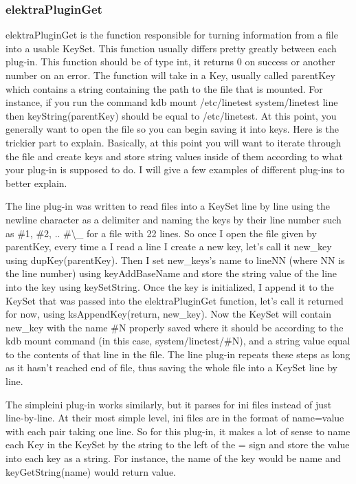 \subsubsection*{elektra\+Plugin\+Get}

{\ttfamily elektra\+Plugin\+Get} is the function responsible for turning information from a file into a usable Key\+Set. This function usually differs pretty greatly between each plug-\/in. This function should be of type int, it returns 0 on success or another number on an error. The function will take in a Key, usually called {\ttfamily parent\+Key} which contains a string containing the path to the file that is mounted. For instance, if you run the command {\ttfamily kdb mount /etc/linetest system/linetest line} then {\ttfamily key\+String(parent\+Key)} should be equal to {\ttfamily /etc/linetest}. At this point, you generally want to open the file so you can begin saving it into keys. Here is the trickier part to explain. Basically, at this point you will want to iterate through the file and create keys and store string values inside of them according to what your plug-\/in is supposed to do. I will give a few examples of different plug-\/ins to better explain.

The line plug-\/in was written to read files into a Key\+Set line by line using the newline character as a delimiter and naming the keys by their line number such as {\ttfamily \#1}, {\ttfamily \#2}, .. {\ttfamily \#\textbackslash{}\+\_} for a file with 22 lines. So once I open the file given by {\ttfamily parent\+Key}, every time a I read a line I create a new key, let's call it new\+\_\+key using dup\+Key(parent\+Key). Then I set new\+\_\+keys's name to line\+N\+N (where N\+N is the line number) using {\ttfamily key\+Add\+Base\+Name} and store the string value of the line into the key using {\ttfamily key\+Set\+String}. Once the key is initialized, I append it to the Key\+Set that was passed into the elektra\+Plugin\+Get function, let's call it returned for now, using {\ttfamily ks\+Append\+Key(return, new\+\_\+key)}. Now the Key\+Set will contain {\ttfamily new\+\_\+key} with the name {\ttfamily \#\+N} properly saved where it should be according to the {\ttfamily kdb mount} command (in this case, {\ttfamily system/linetest/\#\+N}), and a string value equal to the contents of that line in the file. The line plug-\/in repeats these steps as long as it hasn't reached end of file, thus saving the whole file into a Key\+Set line by line.

The simpleini plug-\/in works similarly, but it parses for ini files instead of just line-\/by-\/line. At their most simple level, ini files are in the format of {\ttfamily name=value} with each pair taking one line. So for this plug-\/in, it makes a lot of sense to name each Key in the Key\+Set by the string to the left of the {\ttfamily =} sign and store the value into each key as a string. For instance, the name of the key would be {\ttfamily name} and {\ttfamily key\+Get\+String(name)} would return {\ttfamily value}.

